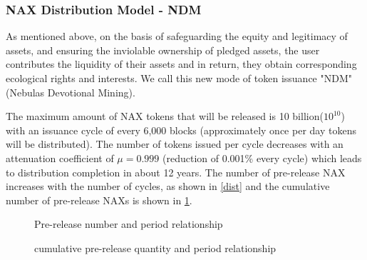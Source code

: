 \subsubsection{NAX Distribution Model - NDM}
As mentioned above, on the basis of safeguarding the equity and legitimacy of assets, and ensuring the inviolable ownership of pledged assets, the user contributes the liquidity of their assets and in return, they obtain corresponding ecological rights and interests. We call this new mode of token issuance "NDM" (Nebulas Devotional Mining). 

The maximum amount of NAX tokens that will be released is 10 billion(\(10^{10}\)) with an issuance cycle of every 6,000 blocks (approximately once per day tokens will be distributed). The number of tokens issued per cycle decreases with an attenuation coefficient of $\mu=0.999$ (reduction of 0.001\% every cycle) which leads to distribution completion in about 12 years. The number of pre-release NAX increases with the number of cycles, as shown in \ref{dist} and the cumulative number of pre-release NAXs is shown in \ref{acc}.

\begin{figure}[h]
\centering
\begin{minipage}[5cm]{.45\textwidth}
\centering
\caption{Pre-release number and period relationship}\label{dist}

\vspace{\baselineskip}
\end{minipage}\qquad
\begin{minipage}[5cm]{.45\textwidth}
\centering
\caption{cumulative pre-release quantity and period relationship}\label{acc}
\end{minipage}
\end{figure}


